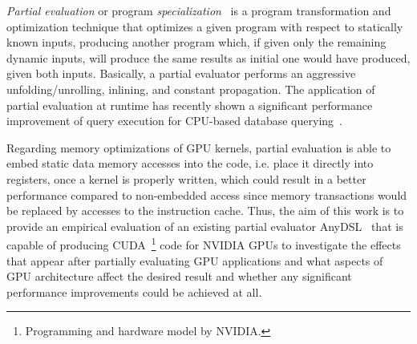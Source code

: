 \textit{Partial evaluation} or program \textit{specialization}~\cite{Jones1993,PartialEvalPaper} is a program transformation and optimization technique that optimizes a given program with respect to statically known inputs, producing another program which, if given only the remaining dynamic inputs, will produce the same results as initial one would have produced, given both inputs.
Basically, a partial evaluator performs an aggressive unfolding/unrolling, inlining, and constant propagation.  
The application of partial evaluation at runtime has recently shown a significant performance improvement of query execution for CPU-based database querying~\cite{LLVM-mix}. 

Regarding memory optimizations of GPU kernels, partial evaluation is able to embed static data memory accesses into the code, i.e. place it directly into registers, once a kernel is properly written, which could result in a better performance compared to non-embedded access since memory transactions would be replaced by accesses to the instruction cache. Thus, the aim of this work is to provide an empirical evaluation of an existing partial evaluator AnyDSL~\cite{LeiBa} that is capable of producing CUDA~\footnote{Programming and hardware model by NVIDIA.} code for NVIDIA GPUs to investigate the effects that appear after partially evaluating GPU applications and what aspects of GPU architecture affect the desired result and whether any significant performance improvements could be achieved at all.